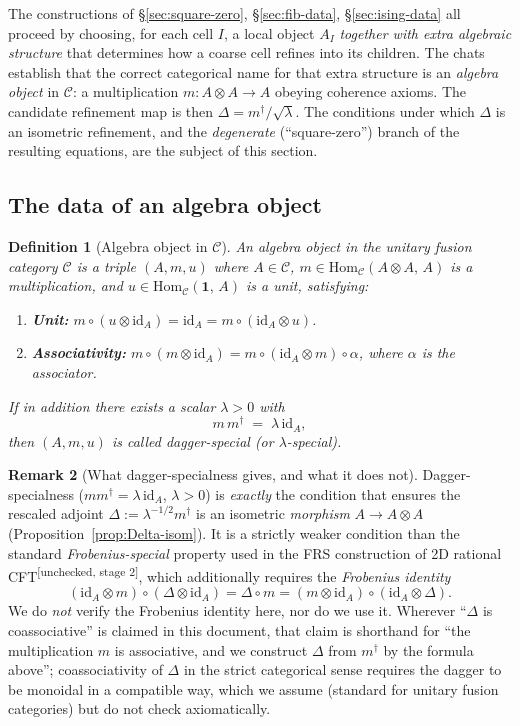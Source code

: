 \documentclass[11pt,a4paper]{article}
\newtheorem{definition}{Definition}[section]
\theoremstyle{definition}
\newtheorem{remark}[definition]{Remark}
\newcommand{\Cc}{\mathcal{C}}
\newcommand{\Hom}{\mathrm{Hom}}
\newcommand{\id}{\mathrm{id}}
\newcommand{\one}{\mathbf{1}}
\newcommand{\unchecked}{\textsuperscript{\textcolor{red!70!black}{[unchecked, stage 2]}}}
\begin{document}
The constructions of \S\ref{sec:square-zero}, \S\ref{sec:fib-data},
\S\ref{sec:ising-data} all proceed by choosing, for each cell $I$, a local
object $A_I$ \emph{together with extra algebraic structure} that determines
how a coarse cell refines into its children. The chats establish that the
correct categorical name for that extra structure is an \emph{algebra object}
in $\Cc$: a multiplication $m:A\otimes A\to A$ obeying coherence axioms.
The candidate refinement map is then $\Delta = m^{\dagger}/\sqrt{\lambda}$.
The conditions under which $\Delta$ is an isometric refinement, and the
\emph{degenerate} (``square-zero'') branch of the resulting equations, are
the subject of this section.

\subsection{The data of an algebra object}

\begin{definition}[Algebra object in $\Cc$]\label{def:algobj}
An \emph{algebra object} in the unitary fusion category $\Cc$ is a triple
$(A, m, u)$ where $A\in\Cc$, $m\in\Hom_\Cc(A\otimes A,\,A)$ is a
\emph{multiplication}, and $u\in\Hom_\Cc(\one,\,A)$ is a \emph{unit},
satisfying:
\begin{enumerate}[label=(\roman*)]
\item \textbf{Unit:} $m\circ(u\otimes\id_A) = \id_A = m\circ(\id_A\otimes u)$.
\item \textbf{Associativity:} $m\circ(m\otimes\id_A)
      = m\circ(\id_A\otimes m)\circ\alpha$, where $\alpha$ is the associator.
\end{enumerate}
If in addition there exists a scalar $\lambda>0$ with
\[
m\,m^{\dagger} \;=\; \lambda\,\id_A,
\]
then $(A,m,u)$ is called \emph{dagger-special} (or \emph{$\lambda$-special}).
\end{definition}

\begin{remark}[What dagger-specialness gives, and what it does not]\label{rem:dagger-special-scope}
Dagger-specialness ($mm^{\dagger} = \lambda\,\id_A$, $\lambda>0$) is
\emph{exactly} the condition that ensures the rescaled adjoint
$\Delta := \lambda^{-1/2}m^{\dagger}$ is an isometric \emph{morphism}
$A\to A\otimes A$ (Proposition~\ref{prop:Delta-isom}). It is a strictly
weaker condition than the standard \emph{Frobenius-special} property used
in the FRS construction of 2D rational CFT\unchecked, which additionally
requires the \emph{Frobenius identity}
\[
(\id_A\otimes m)\circ(\Delta\otimes\id_A) = \Delta\circ m = (m\otimes\id_A)\circ(\id_A\otimes\Delta).
\]
We do \emph{not} verify the Frobenius identity here, nor do we use it.
Wherever ``$\Delta$ is coassociative'' is claimed in this document, that
claim is shorthand for ``the multiplication $m$ is associative, and we
construct $\Delta$ from $m^\dagger$ by the formula above''; coassociativity
of $\Delta$ in the strict categorical sense requires the dagger to be
monoidal in a compatible way, which we assume (standard for unitary fusion
categories) but do not check axiomatically.
\end{remark}
\end{document}
